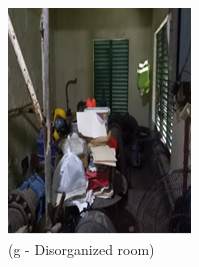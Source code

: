 \begin{figure}[!h]
\begin{minipage}[b]{0.22\linewidth}
		\includegraphics[width=\textwidth]{figures/fig_ch04_fdas_disorganizedroom}
		\caption*{(g - Disorganized room)}
	\end{minipage}
	\hspace{0.03cm}
	\begin{minipage}[b]{0.22\linewidth}

\end{minipage}
\end{figure}
